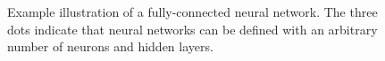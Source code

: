 



\begin{figure}[t]
    \caption{Example illustration of a fully-connected neural network. The three dots indicate that neural networks can be defined with an arbitrary number of neurons and hidden layers.}
    \label{fig:neural-net}
\end{figure}



